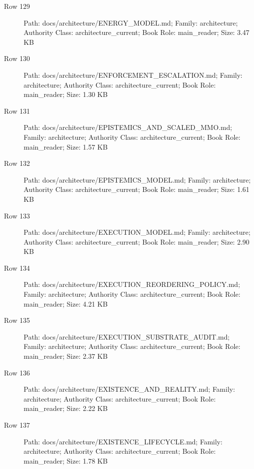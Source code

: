 \documentclass[9pt,a4paper]{book}
\begin{document}
\begin{description}
\item[Row 129] Path: docs/\allowbreak{}architecture/\allowbreak{}ENERGY\_\allowbreak{}MODEL.\allowbreak{}md; Family: architecture; Authority Class: architecture\_\allowbreak{}current; Book Role: main\_\allowbreak{}reader; Size: 3.\allowbreak{}47 KB
\item[Row 130] Path: docs/\allowbreak{}architecture/\allowbreak{}ENFORCEMENT\_\allowbreak{}ESCALATION.\allowbreak{}md; Family: architecture; Authority Class: architecture\_\allowbreak{}current; Book Role: main\_\allowbreak{}reader; Size: 1.\allowbreak{}30 KB
\item[Row 131] Path: docs/\allowbreak{}architecture/\allowbreak{}EPISTEMICS\_\allowbreak{}AND\_\allowbreak{}SCALED\_\allowbreak{}MMO.\allowbreak{}md; Family: architecture; Authority Class: architecture\_\allowbreak{}current; Book Role: main\_\allowbreak{}reader; Size: 1.\allowbreak{}57 KB
\item[Row 132] Path: docs/\allowbreak{}architecture/\allowbreak{}EPISTEMICS\_\allowbreak{}MODEL.\allowbreak{}md; Family: architecture; Authority Class: architecture\_\allowbreak{}current; Book Role: main\_\allowbreak{}reader; Size: 1.\allowbreak{}61 KB
\item[Row 133] Path: docs/\allowbreak{}architecture/\allowbreak{}EXECUTION\_\allowbreak{}MODEL.\allowbreak{}md; Family: architecture; Authority Class: architecture\_\allowbreak{}current; Book Role: main\_\allowbreak{}reader; Size: 2.\allowbreak{}90 KB
\item[Row 134] Path: docs/\allowbreak{}architecture/\allowbreak{}EXECUTION\_\allowbreak{}REORDERING\_\allowbreak{}POLICY.\allowbreak{}md; Family: architecture; Authority Class: architecture\_\allowbreak{}current; Book Role: main\_\allowbreak{}reader; Size: 4.\allowbreak{}21 KB
\item[Row 135] Path: docs/\allowbreak{}architecture/\allowbreak{}EXECUTION\_\allowbreak{}SUBSTRATE\_\allowbreak{}AUDIT.\allowbreak{}md; Family: architecture; Authority Class: architecture\_\allowbreak{}current; Book Role: main\_\allowbreak{}reader; Size: 2.\allowbreak{}37 KB
\item[Row 136] Path: docs/\allowbreak{}architecture/\allowbreak{}EXISTENCE\_\allowbreak{}AND\_\allowbreak{}REALITY.\allowbreak{}md; Family: architecture; Authority Class: architecture\_\allowbreak{}current; Book Role: main\_\allowbreak{}reader; Size: 2.\allowbreak{}22 KB
\item[Row 137] Path: docs/\allowbreak{}architecture/\allowbreak{}EXISTENCE\_\allowbreak{}LIFECYCLE.\allowbreak{}md; Family: architecture; Authority Class: architecture\_\allowbreak{}current; Book Role: main\_\allowbreak{}reader; Size: 1.\allowbreak{}78 KB

\end{description}
\end{document}
